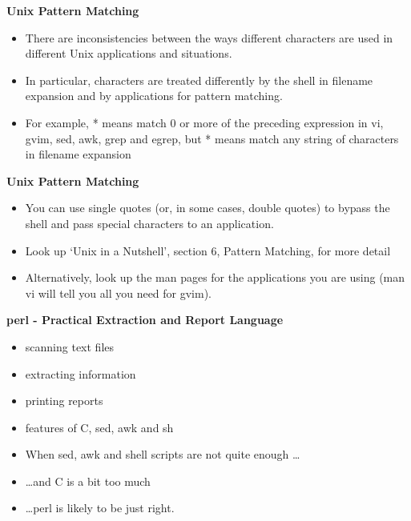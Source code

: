 \setcounter{slide}{42}
%
%
\begin{slide}{}
{\bf Unix Pattern Matching}
\begin{itemize}

\item There are inconsistencies between the ways different characters are
used in different Unix applications and situations.

\item In particular, characters are treated differently by the shell 
in filename expansion and by applications for pattern matching.

\item For example, * means match 0 or more of the preceding expression 
in vi, gvim, sed, awk, grep and egrep, but * means match any string of
characters in filename expansion

\end{itemize}
\end{slide}

%
%
\begin{slide}{}
{\bf Unix Pattern Matching}
\begin{itemize}

\item You can use single quotes (or, in some cases, double quotes) to
bypass the shell and pass special characters to an application.

\item Look up `Unix in a Nutshell', section 6, Pattern Matching, for
more detail

\item Alternatively, look up the man pages for the applications you are
using (man vi will tell you all you need for gvim).

\end{itemize}

\end{slide}

%
%
\begin{slide}{}
{\bf perl - Practical Extraction and Report Language}

\begin{itemize}
\item scanning text files
\item extracting information
\item printing reports
\item features of C, sed, awk and sh
\item When sed, awk and shell scripts are not quite enough \ldots
\item \ldots and C is a bit too much
\item \ldots perl is likely to be just right.
\end{itemize}

\end{slide}

